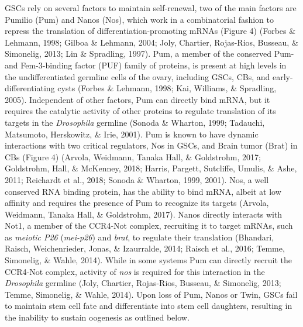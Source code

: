 \documentclass[12pt,oneside]{reedthesis}
\begin{document}
GSCs rely on several factors to maintain self-renewal, two of the main
factors are Pumilio (Pum) and Nanos (Nos), which work in a combinatorial
fashion to repress the translation of differentiation-promoting mRNAs
(Figure 4) (Forbes \& Lehmann, 1998; Gilboa \& Lehmann, 2004; Joly, Chartier, Rojas-Rios, Busseau, \& Simonelig, 2013; Lin \& Spradling, 1997).
Pum, a member of the conserved Pum- and Fem-3-binding factor (PUF)
family of proteins, is present at high levels in the undifferentiated
germline cells of the ovary, including GSCs, CBs, and
early-differentiating cysts (Forbes \& Lehmann, 1998; Kai, Williams, \& Spradling, 2005). Independent of
other factors, Pum can directly bind mRNA, but it requires the catalytic
activity of other proteins to regulate translation of its targets in the
\emph{Drosophila} germline (Sonoda \& Wharton, 1999; Tadauchi, Matsumoto, Herskowitz, \& Irie, 2001). Pum is known
to have dynamic interactions with two critical regulators, Nos in GSCs,
and Brain tumor (Brat) in CBs (Figure 4) (Arvola, Weidmann, Tanaka Hall, \& Goldstrohm, 2017; Goldstrohm, Hall, \& McKenney, 2018; Harris, Pargett, Sutcliffe, Umulis, \& Ashe, 2011; Reichardt et al., 2018; Sonoda \& Wharton, 1999, 2001). Nos, a well conserved RNA binding protein, has the
ability to bind mRNA, albeit at low affinity and requires the presence
of Pum to recognize its targets (Arvola, Weidmann, Tanaka Hall, \& Goldstrohm, 2017). Nanos directly
interacts with Not1, a member of the CCR4-Not complex, recruiting it to
target mRNAs, such as \emph{meiotic P26} (\emph{mei-p26}) and \emph{brat}, to regulate
their translation (Bhandari, Raisch, Weichenrieder, Jonas, \& Izaurralde, 2014; Raisch et al., 2016; Temme, Simonelig, \& Wahle, 2014).
While in some systems Pum can directly recruit the CCR4-Not complex,
activity of \emph{nos} is required for this interaction in the \emph{Drosophila}
germline (Joly, Chartier, Rojas-Rios, Busseau, \& Simonelig, 2013; Temme, Simonelig, \& Wahle, 2014). Upon loss of Pum, Nanos or Twin,
GSCs fail to maintain stem cell fate and differentiate into stem cell
daughters, resulting in the inability to sustain oogenesis as outlined
below.
\end{document}
